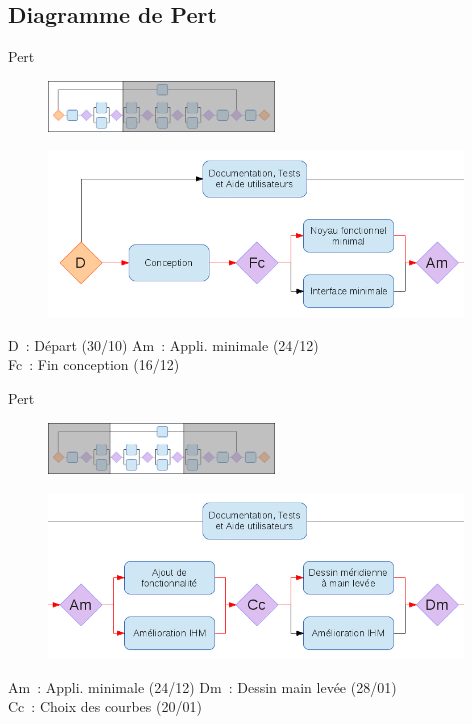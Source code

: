\documentclass{beamer}
\begin{document}
	\subsection{Diagramme de Pert} 
	\begin{frame}{Pert}
		\begin{figure}
			\includegraphics[width=6cm]
				{../Lancement/ImagesLancement/miniature1.png}
		\end{figure}\begin{figure}
			\includegraphics[width=11cm]
				{../Lancement/ImagesLancement/pert_part_1.png}
		\end{figure}
		\footnotesize{D~: D\'epart (30/10) \hfill Am~: Appli. minimale (24/12)\\
			\hfill Fc~: Fin conception (16/12) \hspace*{\fill}}
	\end{frame}

	\begin{frame}{Pert}
		\begin{figure}
			\includegraphics[width=6cm]
				{../Lancement/ImagesLancement/miniature2.png}
		\end{figure}\begin{figure}
			\includegraphics[width=11cm]
				{../Lancement/ImagesLancement/pert_part_2.png}
		\end{figure}
		\footnotesize{Am~: Appli. minimale (24/12) \hfill Dm~: Dessin main 
			lev\'ee (28/01)\\
			\hfill Cc~: Choix des courbes (20/01) \hspace*{\fill}}
	\end{frame}
\end{document}
